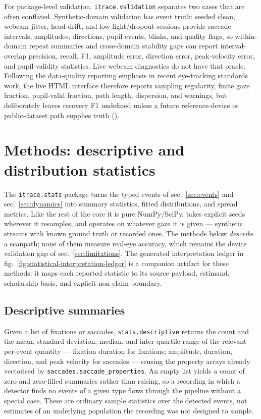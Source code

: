 \documentclass[
]{article}
\newcounter{none} %
\begin{document}
For package-level validation, \texttt{itrace.validation} separates two
cases that are often conflated. Synthetic-domain validation has event
truth: seeded clean, webcam-jitter, head-drift, and low-light/dropout
sessions provide saccade intervals, amplitudes, directions, pupil
events, blinks, and quality flags, so within-domain repeat summaries and
cross-domain stability gaps can report interval-overlap precision,
recall, F1, amplitude error, direction error, peak-velocity error, and
pupil-validity statistics. Live webcam diagnostics do not have that
oracle. Following the data-quality reporting emphasis in recent
eye-tracking standards work, the live HTML interface therefore reports
sampling regularity, finite gaze fraction, pupil-valid fraction, path
length, dispersion, and warnings, but deliberately leaves recovery F1
undefined unless a future reference-device or public-dataset path
supplies truth ().

\section{Methods: descriptive and distribution
statistics}\label{sec:diststats}

The \texttt{itrace.stats} package turns the typed events of
sec.~\ref{sec:events} and sec.~\ref{sec:dynamics} into summary
statistics, fitted distributions, and spread metrics. Like the rest of
the core it is pure NumPy/SciPy, takes explicit seeds wherever it
resamples, and operates on whatever gaze it is given --- synthetic
streams with known ground truth or recorded ones. The methods below
\emph{describe} a scanpath; none of them measure real-eye accuracy,
which remains the device validation gap of sec.~\ref{sec:limitations}.
The generated interpretation ledger in
fig.~\ref{fig:statistical-interpretation-ledger} is a companion artifact
for these methods: it maps each reported statistic to its source
payload, estimand, scholarship basis, and explicit non-claim boundary.

\subsection{Descriptive summaries}\label{descriptive-summaries}

Given a list of fixations or saccades, \texttt{stats.descriptive}
returns the count and the mean, standard deviation, median, and
inter-quartile range of the relevant per-event quantity --- fixation
duration for fixations; amplitude, duration, direction, and peak
velocity for saccades --- reusing the property arrays already vectorised
by \texttt{saccades.saccade\_properties}. An empty list yields a count
of zero and zero-filled summaries rather than raising, so a recording in
which a detector finds no events of a given type flows through the
pipeline without a special case. These are ordinary sample statistics
over the detected events, not estimates of an underlying population the
recording was not designed to sample.
\end{document}
